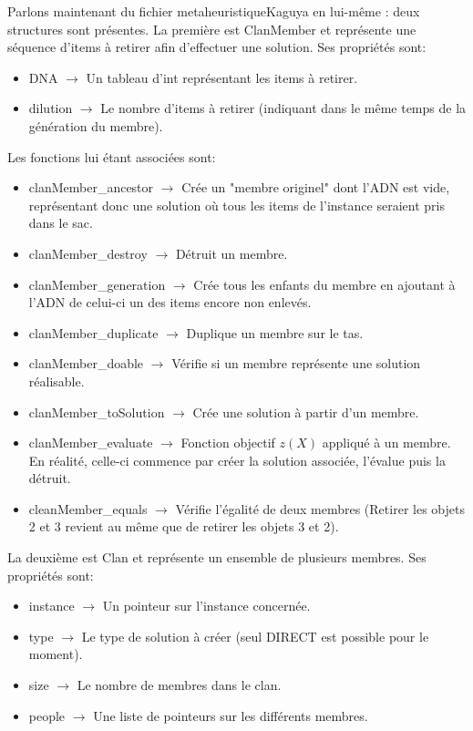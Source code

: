 \documentclass{EPUProjetPeiP}
\begin{document}
Parlons maintenant du fichier metaheuristiqueKaguya en lui-même : deux structures sont présentes. La première est ClanMember et représente une séquence d'items à retirer afin d'effectuer une solution. Ses propriétés sont:
\begin{itemize}
	\item DNA $\longrightarrow$ Un tableau d'int représentant les items à retirer.
	\item dilution $\longrightarrow$ Le nombre d'items à retirer (indiquant dans le même temps de la génération du membre).\\
\end{itemize}

Les fonctions lui étant associées sont:
\begin{itemize}
	\item clanMember\_ancestor $\longrightarrow$ Crée un "membre originel" dont l'ADN est vide, représentant donc une solution où tous les items de l'instance seraient pris dans le sac. 
	\item clanMember\_destroy $\longrightarrow$ Détruit un membre.
	\item clanMember\_generation $\longrightarrow$ Crée tous les enfants du membre en ajoutant à l'ADN de celui-ci un des items encore non enlevés.
	\item clanMember\_duplicate $\longrightarrow$ Duplique un membre sur le tas.
	\item clanMember\_doable $\longrightarrow$ Vérifie si un membre représente une solution réalisable.
	\item clanMember\_toSolution $\longrightarrow$ Crée une solution à partir d'un membre.
	\item clanMember\_evaluate $\longrightarrow$ Fonction objectif $z(X)$ appliqué à un membre. En réalité, celle-ci commence par créer la solution associée, l'évalue puis la détruit.
	\item cleanMember\_equals $\longrightarrow$ Vérifie l'égalité de deux membres (Retirer les objets 2 et 3 revient au même que de retirer les objets 3 et 2).\\
\end{itemize}


La deuxième est Clan et représente un ensemble de plusieurs membres. Ses propriétés sont:
\begin{itemize}
	\item instance $\longrightarrow$ Un pointeur sur l'instance concernée.
	\item type $\longrightarrow$ Le type de solution à créer (seul DIRECT est possible pour le moment).
	\item size $\longrightarrow$ Le nombre de membres dans le clan.
	\item people $\longrightarrow$ Une liste de pointeurs sur les différents membres.\\
\end{itemize}
\end{document}
